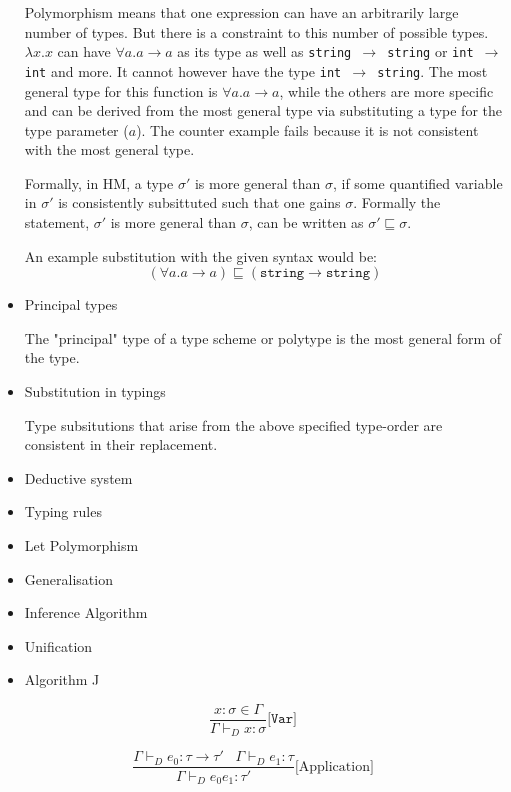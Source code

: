 \documentclass{l4proj}
\begin{document}
\begin{itemize}
    Polymorphism means that one expression can have an arbitrarily large number of types.
    But there is a constraint to this number of possible types.
    $\lambda x . x$ can have $\forall a . a \rightarrow a$ as its type as well as \texttt{string $\rightarrow$ string} or \texttt{int $\rightarrow$ int} and more.
    It cannot however have the type \texttt{int $\rightarrow$ string}.
    The most general type for this function is $\forall a . a \rightarrow a$, while the others are more specific and can be derived from the most general type via substituting a type for the type parameter ($a$).
    The counter example fails because it is not consistent with the most general type.

    Formally, in HM, a type $\sigma ' $ is more general than $\sigma$, if some quantified variable in $\sigma'$ is consistently subsittuted such that one gains $\sigma$.
    Formally the statement, $\sigma ' $ is more general than $\sigma$, can be written as $\sigma' \sqsubseteq \sigma$.

    An example substitution with the given syntax would be:
    \[(\forall a . a \rightarrow a) \sqsubseteq (\texttt{string} \rightarrow \texttt{string})\]
    \item Principal types
    
    The "principal" type of a type scheme or polytype is the most general form of the type.
    \item Substitution in typings
    
    Type subsitutions that arise from the above specified type-order are consistent in their replacement.
    \item Deductive system
    \item Typing rules
    \item Let Polymorphism
    \item Generalisation
    \item Inference Algorithm
    \item Unification 
    \item Algorithm J
    
\end{itemize}


\begin{equation} \label{eq:HM-Var}
    \frac{x : \sigma \in \Gamma}{\Gamma \vdash_D x : \sigma}\texttt{[Var]}
\end{equation}

\begin{equation} \label{eq:HM-App}
    \frac{\Gamma \vdash_D e_0 : \tau \rightarrow \tau' \;\;\; \Gamma \vdash_D e_1 : \tau}{\Gamma \vdash_D e_0 e_1 : \tau'}\text{[Application]}
\end{equation}
\end{document}
